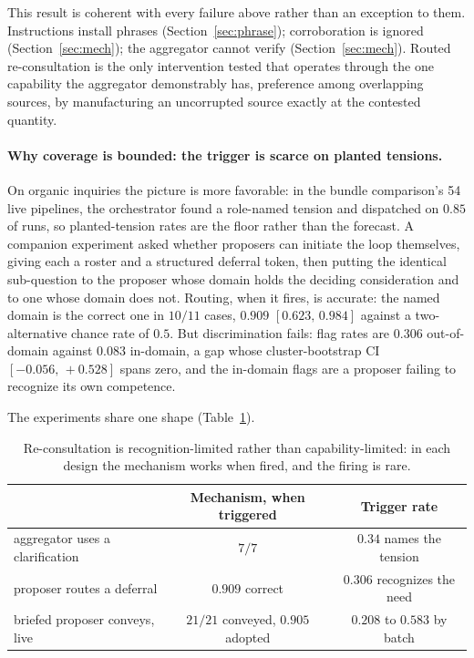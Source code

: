 \documentclass[11pt]{article}
\newcommand{\ci}[2]{\ensuremath{[#1,\,#2]}}
\begin{document}
This result is coherent with every failure above rather than an
exception to them. Instructions install phrases
(Section~\ref{sec:phrase}); corroboration is ignored
(Section~\ref{sec:mech}); the aggregator cannot verify
(Section~\ref{sec:mech}). Routed re-consultation is the only
intervention tested that operates through the one capability the
aggregator demonstrably has, preference among overlapping sources, by
manufacturing an uncorrupted source exactly at the contested quantity.

\paragraph{Why coverage is bounded: the trigger is scarce on planted
tensions.} On organic inquiries the picture is more favorable: in the
bundle comparison's 54 live pipelines, the orchestrator found a
role-named tension and dispatched on $0.85$ of runs, so planted-tension
rates are the floor rather than the forecast. A companion experiment
asked whether proposers can initiate the loop themselves, giving each a
roster and a structured deferral token, then putting the identical
sub-question to the proposer whose domain holds the deciding
consideration and to one whose domain does not. Routing, when it fires,
is accurate: the named domain is the correct one in $10/11$ cases,
$0.909$ \ci{0.623}{0.984} against a two-alternative chance rate of
$0.5$. But discrimination fails: flag rates are $0.306$ out-of-domain
against $0.083$ in-domain, a gap whose cluster-bootstrap CI
\ci{-0.056}{+0.528} spans zero, and the in-domain flags are a proposer
failing to recognize its own competence.

The experiments share one shape (Table~\ref{tab:trigger}).

\begin{table}[t]
\centering\small
\begin{tabular}{lcc}
\toprule
 & Mechanism, when triggered & Trigger rate \\
\midrule
aggregator uses a clarification & $7/7$ & $0.34$ names the tension \\
proposer routes a deferral & $0.909$ correct & $0.306$ recognizes the need \\
briefed proposer conveys, live & $21/21$ conveyed, $0.905$ adopted &
  $0.208$ to $0.583$ by batch \\
\bottomrule
\end{tabular}
\caption{Re-consultation is recognition-limited rather than
capability-limited: in each design the mechanism works when fired, and
the firing is rare.}
\label{tab:trigger}
\end{table}
\end{document}
